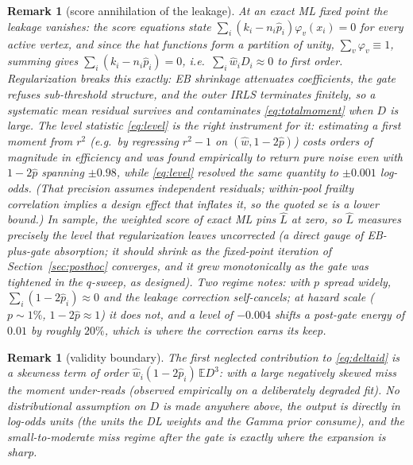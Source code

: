 \documentclass[11pt]{article}
\newtheorem{remark}[proposition]{Remark}
\newcommand{\E}{\mathbb{E}}
\begin{document}
\begin{remark}[score annihilation of the leakage]\label{rem:leakage}
At an exact ML fixed point the leakage vanishes: the score equations state
$\sum_i(k_i-n_i\hat p_i)\varphi_v(x_i)=0$ for every active vertex, and since the hat
functions form a partition of unity, $\sum_v\varphi_v\equiv 1$, summing gives
$\sum_i(k_i-n_i\hat p_i)=0$, i.e.\ $\sum_i\hat w_iD_i\approx 0$ to first order.
Regularization breaks this exactly: EB shrinkage attenuates coefficients, the gate
refuses sub-threshold structure, and the outer IRLS terminates finitely, so a
systematic mean residual survives and contaminates \eqref{eq:totalmoment} when $D$ is
large. The level statistic \eqref{eq:level} is the right instrument for it: estimating a
first moment from $r^2$ (e.g.\ by regressing $r^2-1$ on $(\hat w,1-2\hat p)$) costs
orders of magnitude in efficiency and was found empirically to return pure noise even
with $1-2\hat p$ spanning $\pm0.98$, while \eqref{eq:level} resolved the same
quantity to $\pm 0.001$ log-odds. (That precision assumes independent residuals; within-pool frailty correlation implies a design effect that inflates it, so the quoted se is a lower bound.) In sample, the weighted score of exact ML pins
$\hat L$ at zero, so $\hat L$ measures precisely the level that regularization leaves
uncorrected (a direct gauge of EB-plus-gate absorption; it should shrink as the
fixed-point iteration of Section~\ref{sec:posthoc} converges, and it grew
monotonically as the gate was tightened in the $q$-sweep, as designed). Two regime
notes: with $p$ spread widely, $\sum_i(1-2\hat p_i)\approx 0$ and the leakage
correction self-cancels; at hazard scale ($p\sim1\%$, $1-2\hat p\approx1$) it does
not, and a level of $-0.004$ shifts a post-gate energy of $0.01$ by roughly $20\%$,
which is where the correction earns its keep.
\end{remark}

\begin{remark}[validity boundary]
The first neglected contribution to \eqref{eq:deltaid} is a skewness term of order
$\hat w_i(1-2\hat p_i)\,\E D^3$: with a large negatively skewed miss the moment
under-reads (observed empirically on a deliberately degraded fit). No distributional
assumption on $D$ is made anywhere above, the output is directly in log-odds units
(the units the DL weights and the Gamma prior consume), and the small-to-moderate
miss regime after the gate is exactly where the expansion is sharp.
\end{remark}
\end{document}
